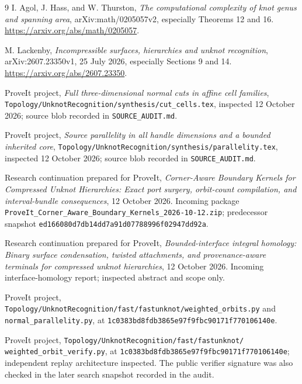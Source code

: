 \documentclass[11pt]{article}
\theoremstyle{definition}\newtheorem{definition}[theorem]{Definition}\newtheorem{example}[theorem]{Example}
\theoremstyle{remark}\newtheorem{remark}[theorem]{Remark}
\newcommand{\code}[1]{\texttt{#1}}
\newcommand{\snapshot}{\texttt{1c0383bd8fdb3865e97f9fbc90171f770106140e}}
\begin{document}
\begingroup\small\setlength{\parskip}{0pt}
\begin{thebibliography}{9}\setlength{\itemsep}{2pt}
 I. Agol, J. Hass, and W. Thurston,
\emph{The computational complexity of knot genus and spanning area},
arXiv:math/0205057v2, especially Theorems 12 and 16.
\url{https://arxiv.org/abs/math/0205057}.

 M. Lackenby,
\emph{Incompressible surfaces, hierarchies and unknot recognition},
arXiv:2607.23350v1, 25 July 2026, especially Sections 9 and 14.
\url{https://arxiv.org/abs/2607.23350}.

 ProveIt project,
\emph{Full three-dimensional normal cuts in affine cell families},
\code{Topology/UnknotRecognition/synthesis/cut\_cells.tex},
inspected 12 October 2026; source blob recorded in \code{SOURCE\_AUDIT.md}.

 ProveIt project,
\emph{Source parallelity in all handle dimensions and a bounded inherited core},
\code{Topology/UnknotRecognition/synthesis/parallelity.tex},
inspected 12 October 2026; source blob recorded in \code{SOURCE\_AUDIT.md}.

 Research continuation prepared for ProveIt,
\emph{Corner-Aware Boundary Kernels for Compressed Unknot Hierarchies:
Exact port surgery, orbit-count compilation, and interval-bundle consequences},
12 October 2026. Incoming package
\code{ProveIt\_Corner\_Aware\_Boundary\_Kernels\_2026-10-12.zip};
predecessor snapshot \texttt{ed166080d7db14dd7a91d07788996f02947dd92a}.

 Research continuation prepared for ProveIt,
\emph{Bounded-interface integral homology: Binary surface condensation,
twisted attachments, and provenance-aware terminals for compressed unknot hierarchies},
12 October 2026. Incoming interface-homology report; inspected abstract and scope only.

 ProveIt project,
\code{Topology/UnknotRecognition/fast/fastunknot/weighted\_orbits.py}
and \code{normal\_parallelity.py}, at \snapshot.

 ProveIt project,
\code{Topology/UnknotRecognition/fast/fastunknot/}\\
\code{weighted\_orbit\_verify.py}, at \snapshot; independent replay architecture inspected. The public verifier signature was also checked in the later search snapshot recorded in the audit.
\end{thebibliography}
\endgroup
\end{document}
